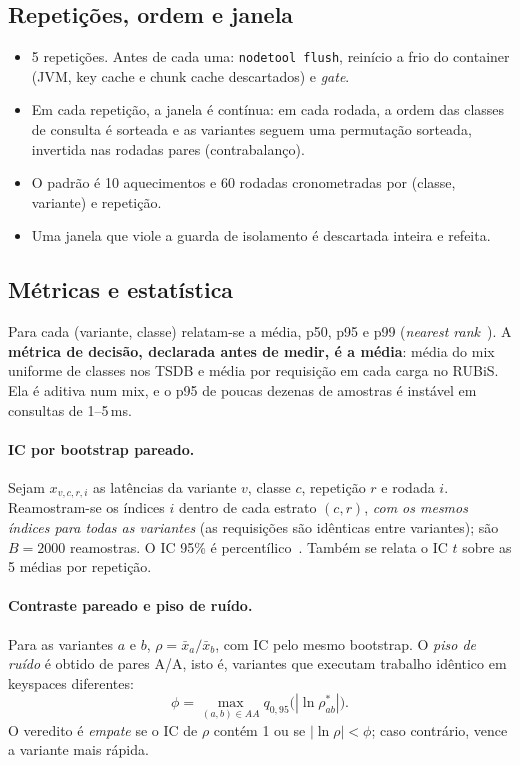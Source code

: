 \documentclass[10pt,a4paper,twoside]{article}
\theoremstyle{definition}\newtheorem{definicao}{Definição}
\begin{document}
\subsection{Repetições, ordem e janela}
\begin{itemize}
\item 5 repetições. Antes de cada uma: \texttt{nodetool flush}, reinício a frio do container (JVM, key cache e chunk cache descartados) e \emph{gate}.
\item Em cada repetição, a janela é contínua: em cada rodada, a ordem das classes de consulta é sorteada e as variantes seguem uma permutação sorteada, invertida nas rodadas pares (contrabalanço).
\item O padrão é 10 aquecimentos e 60 rodadas cronometradas por (classe, variante) e repetição.
\item Uma janela que viole a guarda de isolamento é descartada inteira e refeita.
\end{itemize}

\subsection{Métricas e estatística}
Para cada (variante, classe) relatam-se a média, p50, p95 e p99 (\emph{nearest rank}~\cite{hyndman}). A \textbf{métrica de decisão, declarada antes de medir, é a média}: média do mix uniforme de classes nos TSDB e média por requisição em cada carga no RUBiS. Ela é aditiva num mix, e o p95 de poucas dezenas de amostras é instável em consultas de 1--5\,ms.

\paragraph{IC por bootstrap pareado.} Sejam $x_{v,c,r,i}$ as latências da variante $v$, classe $c$, repetição $r$ e rodada $i$. Reamostram-se os índices $i$ dentro de cada estrato $(c,r)$, \emph{com os mesmos índices para todas as variantes} (as requisições são idênticas entre variantes); são $B=2000$ reamostras. O IC 95\% é percentílico~\cite{efron}. Também se relata o IC $t$ sobre as 5 médias por repetição.

\paragraph{Contraste pareado e piso de ruído.} Para as variantes $a$ e $b$, $\rho=\bar x_a/\bar x_b$, com IC pelo mesmo bootstrap. O \emph{piso de ruído} é obtido de pares A/A, isto é, variantes que executam trabalho idêntico em keyspaces diferentes:
\[
\phi=\max_{(a,b)\in AA} q_{0{,}95}\big(|\ln \rho^{*}_{ab}|\big).
\]
O veredito é \emph{empate} se o IC de $\rho$ contém 1 ou se $|\ln\rho|<\phi$; caso contrário, vence a variante mais rápida.
\end{document}
